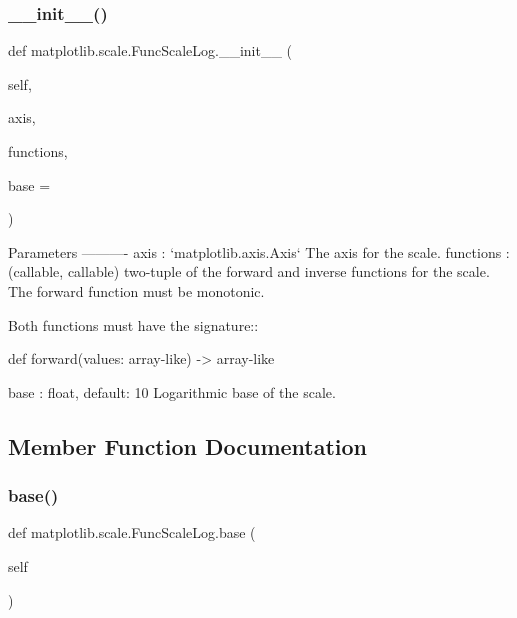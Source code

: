 \subsubsection{\texorpdfstring{\+\_\+\+\_\+init\+\_\+\+\_\+()}{\_\_init\_\_()}}
{\footnotesize\ttfamily def matplotlib.\+scale.\+Func\+Scale\+Log.\+\_\+\+\_\+init\+\_\+\+\_\+ (\begin{DoxyParamCaption}\item[{}]{self,  }\item[{}]{axis,  }\item[{}]{functions,  }\item[{}]{base = {} }\end{DoxyParamCaption})}

\begin{DoxyVerb}Parameters
----------
axis : `matplotlib.axis.Axis`
    The axis for the scale.
functions : (callable, callable)
    two-tuple of the forward and inverse functions for the scale.
    The forward function must be monotonic.

    Both functions must have the signature::

def forward(values: array-like) -> array-like

base : float, default: 10
    Logarithmic base of the scale.
\end{DoxyVerb}
 

\subsection{Member Function Documentation}
\mbox{\label{classmatplotlib_1_1scale_1_1FuncScaleLog_ae90716909ca7baec2acac6a61128ac23}} 
\subsubsection{\texorpdfstring{base()}{base()}}
{\footnotesize\ttfamily def matplotlib.\+scale.\+Func\+Scale\+Log.\+base (\begin{DoxyParamCaption}\item[{}]{self }\end{DoxyParamCaption})}

\mbox{\label{classmatplotlib_1_1scale_1_1FuncScaleLog_a21b9d1201a6921f77b9c372fe468af1e}} 
